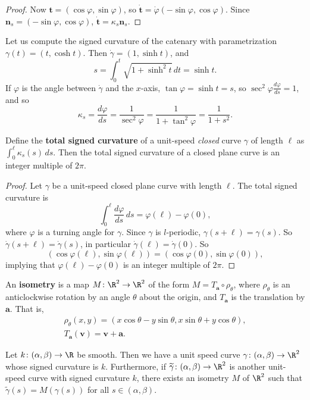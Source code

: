 \begin{proof}
    Now $\mathbf t= (\cos \varphi , \sin \varphi )$, so $\dot{\mathbf t}=\dot \varphi (- \sin \varphi , \cos \varphi )$. Since $\mathbf n_s=(-\sin \varphi , \cos \varphi )$, $\dot{\mathbf t}=\kappa_s \mathbf n_s$.
\end{proof}
\begin{example}
    Let us compute the signed curvature of the catenary with parametrization $\gamma (t)=(t ,\cosh t).$ Then $\dot\gamma =(1, \sinh t)$, and \[
    s= \int_{0}^{t} \sqrt{1+\sinh ^2 t}  \, dt=\sinh t.
    \] If $\varphi $ is the angle between $\dot\gamma $ and the $x$-axis, $\tan \varphi =\sinh t=s$, so $\sec ^2 \varphi \frac{d \varphi }{ds}=1$, and so \[
    \kappa_s= \frac{d\varphi }{ds}=\frac{1}{\sec ^2 \varphi }=\frac{1}{1+\tan ^2\varphi }=\frac{1}{1+s ^2}.
    \] 
\end{example}
\begin{cor}
    Define the \textbf{total signed curvature} of a unit-speed \emph{closed} curve $\gamma $ of length $\ell$ as $\int_{0}^{\ell} \kappa_s(s) \, ds$. Then the total signed curvature of a closed plane curve is an integer multiple of $2\pi$.
\end{cor}
\begin{proof}
    Let $\gamma $ be a unit-speed closed plane curve with length $\ell$. The total signed curvature is \[
        \int_{0}^{\ell} \frac{d\varphi }{ds} \, ds=\varphi (\ell)-\varphi (0),
    \] where $\varphi $ is a turning angle for $\gamma $. Since $\gamma $ is $l$-periodic, $\gamma (s+\ell)=\gamma (s)$. So $\dot\gamma (s+\ell)=\dot\gamma (s)$, in particular $\dot\gamma (\ell)=\dot\gamma (0)$. So \[
    (\cos \varphi (\ell), \sin \varphi (\ell))=(\cos \varphi (0),\sin \varphi (0)),
\] implying that $\varphi (\ell)-\varphi (0)$ is an integer multiple of $2 \pi.$
\end{proof}
An \textbf{isometry} is a map $M \colon \R^2 \to \R^2$ of the form $M=T_{\mathbf a}\circ \rho _{\theta}$, where $\rho _{\theta}$ is an anticlockwise rotation by an angle $\theta$ about the origin, and $T_{\mathbf a}$ is the translation by $\mathbf a$. That is, 
\begin{gather*}
    \rho_{\theta}(x,y)=(x \cos \theta-y \sin \theta, x \sin \theta+y \cos \theta),\\
    T_{\mathbf a}(\mathbf v)=\mathbf v+\mathbf a.
\end{gather*}
\begin{theorem}
    Let $k \colon (\alpha ,\beta ) \to \R$ be smooth. Then we have a unit speed curve $\gamma \colon (\alpha ,\beta ) \to \R^2$ whose signed curvature is $k$. Furthermore, if $\widetilde \gamma \colon (\alpha ,\beta ) \to \R^2$ is another unit-speed curve with signed curvature $k$, there exists an isometry $M$ of $\R^2$ such that $\widetilde \gamma (s)=M(\gamma (s))$ for all $s \in (\alpha ,\beta )$.
\end{theorem}
